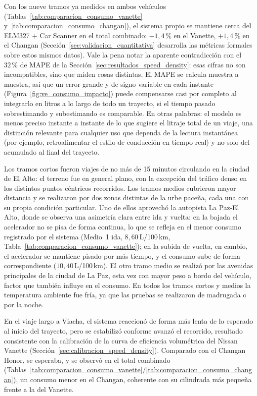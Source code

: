 Con los nueve tramos ya medidos en ambos vehículos (Tablas~\ref{tab:comparacion_consumo_vanette} y~\ref{tab:comparacion_consumo_changan}), el sistema propio se mantiene cerca del ELM327 + Car Scanner en el total combinado: $-1{,}4\,\%$ en el Vanette, $+1{,}4\,\%$ en el Changan (Sección~\ref{sec:validacion_cuantitativa} desarrolla las métricas formales sobre estos mismos datos). Vale la pena notar la aparente contradicción con el $32\,\%$ de MAPE de la Sección~\ref{sec:resultados_speed_density}: esas cifras no son incompatibles, sino que miden cosas distintas. El MAPE se calcula muestra a muestra, así que un error grande y de signo variable en cada instante (Figura~\ref{fig:ve_consumo_impacto}) puede compensarse casi por completo al integrarlo en litros a lo largo de todo un trayecto, si el tiempo pasado sobrestimando y subestimando es comparable. En otras palabras: el modelo es menos preciso instante a instante de lo que sugiere el litraje total de un viaje, una distinción relevante para cualquier uso que dependa de la lectura instantánea (por ejemplo, retroalimentar el estilo de conducción en tiempo real) y no solo del acumulado al final del trayecto.

Los tramos cortos fueron viajes de no más de 15 minutos circulando en la ciudad de El Alto: el terreno fue en general plano, con la excepción del tráfico denso en los distintos puntos céntricos recorridos. Los tramos medios cubrieron mayor distancia y se realizaron por dos zonas distintas de la urbe paceña, cada una con su propia condición particular. Uno de ellos aprovechó la autopista La Paz-El Alto, donde se observa una asimetría clara entre ida y vuelta: en la bajada el acelerador no se pisa de forma continua, lo que se refleja en el menor consumo registrado por el sistema (Medio~1 ida, $8{,}60$\,L/100\,km, Tabla~\ref{tab:comparacion_consumo_vanette}); en la subida de vuelta, en cambio, el acelerador se mantiene pisado por más tiempo, y el consumo sube de forma correspondiente ($10{,}40$\,L/100\,km). El otro tramo medio se realizó por las avenidas principales de la ciudad de La Paz, esta vez con mayor peso a bordo del vehículo, factor que también influye en el consumo. En todos los tramos cortos y medios la temperatura ambiente fue fría, ya que las pruebas se realizaron de madrugada o por la noche.

En el viaje largo a Viacha, el sistema reaccionó de forma más lenta de lo esperado al inicio del trayecto, pero se estabilizó conforme avanzó el recorrido, resultado consistente con la calibración de la curva de eficiencia volumétrica del Nissan Vanette (Sección~\ref{sec:calibracion_speed_density}). Comparado con el Changan Honor, se esperaba, y se observó en el total combinado (Tablas~\ref{tab:comparacion_consumo_vanette}/\ref{tab:comparacion_consumo_changan}), un consumo menor en el Changan, coherente con su cilindrada más pequeña frente a la del Vanette.

